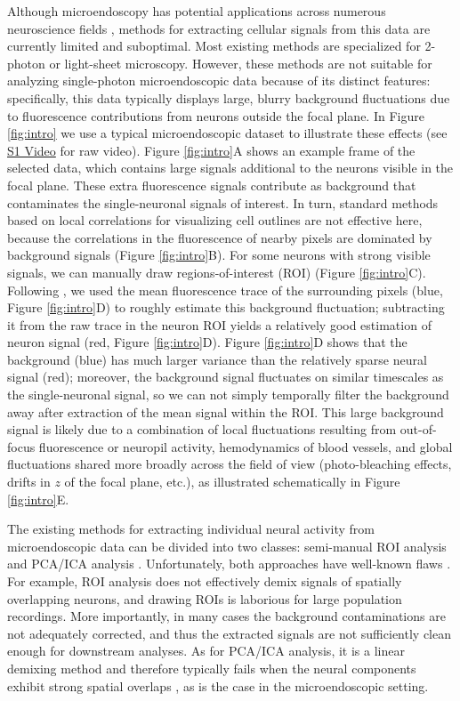 \documentclass[9pt,lineno]{elife}
\begin{document}
Although microendoscopy has potential applications across numerous neuroscience fields \citep{Ziv2015}, methods for extracting cellular signals from this data are currently limited and suboptimal. Most existing methods are specialized for 2-photon or light-sheet microscopy. However, these methods are not suitable for analyzing single-photon microendoscopic data because of its distinct features: specifically, this data typically displays large, blurry background fluctuations due to fluorescence contributions from neurons outside the focal plane.  In Figure \ref{fig:intro} we use a typical microendoscopic dataset to illustrate these effects (see \href{http://www.columbia.edu/~pz2230/videos/example_microendoscopic_data.mp4}{S1 Video} for raw video). Figure \ref{fig:intro}A shows an example frame of the selected data, which contains large signals additional to the neurons visible in the focal plane. These extra fluorescence signals contribute as background that contaminates the single-neuronal signals of interest. In turn, standard methods based on local correlations for visualizing cell outlines \citep{Smith2010} are not effective here, because the correlations in the fluorescence of nearby pixels are dominated by background signals (Figure \ref{fig:intro}B). For some neurons with strong visible signals, we can manually draw  regions-of-interest (ROI) (Figure \ref{fig:intro}C).
Following \citep{Barbera2016,Pinto2015}, we used the mean fluorescence trace of the surrounding pixels (blue, Figure \ref{fig:intro}D) to roughly estimate this background fluctuation; subtracting it from the raw trace in the neuron ROI yields a relatively good estimation of neuron signal (red, Figure \ref{fig:intro}D). Figure \ref{fig:intro}D shows that the background (blue) has much larger variance than the relatively sparse neural signal (red); moreover, the background signal fluctuates on similar timescales as the single-neuronal signal, so we can not simply temporally filter the background away after extraction of the mean signal within the ROI.  This large background signal is likely due to a combination of local fluctuations resulting from out-of-focus fluorescence or neuropil activity, hemodynamics of blood vessels, and global fluctuations shared more broadly across the field of view (photo-bleaching effects, drifts in $z$ of the focal plane, etc.), as illustrated schematically in Figure \ref{fig:intro}E. 

The existing methods for extracting individual neural activity from microendoscopic data can be divided into two classes: semi-manual ROI analysis \citep{Barbera2016,Klaus2017,Pinto2015} and PCA/ICA analysis \citep{Mukamel2009}. Unfortunately, both approaches have well-known flaws \citep{Resendez2016}.  For example, ROI analysis does not effectively demix signals of spatially overlapping neurons, and drawing ROIs is laborious for large population recordings. More importantly, in many cases the background contaminations are not adequately corrected, and thus the extracted signals are not sufficiently clean enough for downstream analyses.  As for PCA/ICA analysis, it is a linear demixing method and therefore typically fails when the neural components exhibit strong spatial overlaps \citep{Pnevmatikakis2016}, as is the case in the microendoscopic setting. 
\end{document}
